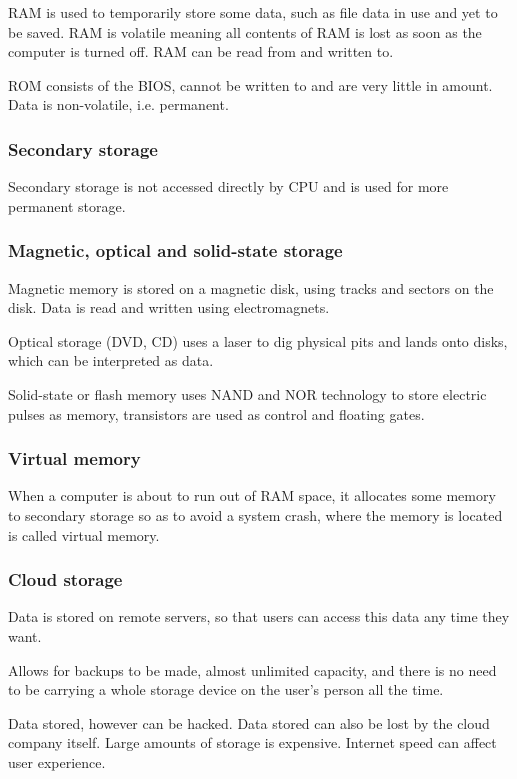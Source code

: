\documentclass{article}
\begin{document}
RAM is used to temporarily store some data, such as file data in use and yet to be saved.
RAM is volatile meaning all contents of RAM is lost as soon as the computer is turned
off. RAM can be read from and written to.

ROM consists of the BIOS, cannot be written to and are very little in amount. Data is 
non-volatile, i.e. permanent.

\subsubsection{Secondary storage}
Secondary storage is not accessed directly by CPU and is used for more permanent storage.

\subsubsection{Magnetic, optical and solid-state storage}
Magnetic memory is stored on a magnetic disk, using tracks and sectors on the disk. Data
is read and written using electromagnets.

Optical storage (DVD, CD) uses a laser to dig physical pits and lands onto disks, which 
can be interpreted as data.

Solid-state or flash memory uses NAND and NOR technology to store electric pulses as 
memory, transistors are used as control and floating gates.

\subsubsection{Virtual memory}
When a computer is about to run out of RAM space, it allocates some memory to secondary
storage so as to avoid a system crash, where the memory is located is called virtual
memory.

\subsubsection{Cloud storage}
Data is stored on remote servers, so that users can access this data any time they want.

Allows for backups to be made, almost unlimited capacity, and there is no need to be
carrying a whole storage device on the user's person all the time.

Data stored, however can be hacked. Data stored can also be lost by the cloud company
itself. Large amounts of storage is expensive. Internet speed can affect user experience.
\end{document}

